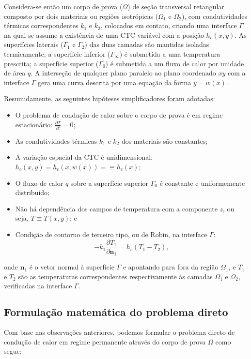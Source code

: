 Considera-se então um corpo de prova ($\Omega$) de seção transversal retangular composto por dois materiais ou regiões isotrópicas ($\Omega_1$ e $\Omega_2$), com
condutividades térmicas correspondentes $k_1$  e $k_2$, colocados em contato,
criando uma interface $\Gamma$ na qual se assume a existência de uma CTC variável com a posição $h_c(x, y)$.
As superfícies laterais ($\Gamma_1$ e $\Gamma_2$) das duas camadas são mantidas isoladas termicamente;
a superfície inferior ($\Gamma_\infty$) é submetida a uma temperatura prescrita; a superfície superior ($\Gamma_0$) é submetida
a um fluxo de calor por unidade de área $q$. A interseção de qualquer plano paralelo ao plano coordenado $xy$ com a interface $\Gamma$ gera uma
curva descrita por uma equação da forma $y = w(x)$.

Resumidamente, as seguintes hipóteses simplificadores foram adotadas:
\begin{itemize}
  \item O problema de condução de calor sobre o corpo de prova é em regime estacionário: $\displaystyle\frac{\partial T}{\partial t} = 0$;
  \item As condutividades térmicas $k_1$ e $k_2$ dos materiais são constantes;
  \item A variação espacial da CTC é unidimensional: $h_c(x, y) = h_c(x, w(x)) = \equiv h_c(x)$;
  \item O fluxo de calor $q$ sobre a superfície superior $\Gamma_0$ é constante e uniformemente distribuído;
  \item Não há dependência dos campos de temperatura com a componente $z$, ou seja, $T \equiv T(x, y)$; e
  \item Condição de contorno de terceiro tipo, ou de Robin, na interface $\Gamma$:
  		\begin{equation*}
  			-k_1\frac{\partial T_1}{\partial \mathbf{n}_1} = h_c(T_1 - T_2),
  		\end{equation*}   
\end{itemize} 
onde
$\mathbf{n}_1$ é o vetor normal à superfície $\Gamma$ e apontando para fora da região $\Omega_1$, e $T_1$ e $T_2$ são as temperaturas
correspondentes respectivamente às camadas $\Omega_1$ e $\Omega_2$, verificadas na interface $\Gamma$.

\subsection{Formulação matemática do problema direto}\label{sec_formulacao_direta}
Com base nas observações anteriores, podemos formular o problema direto de condução de calor em regime permanente através do corpo de prova $\Omega$ como segue: 

